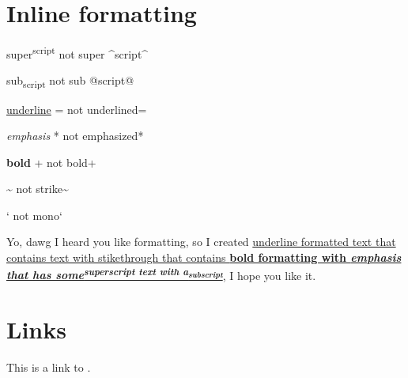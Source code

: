 \section{\label{inline-formatting}Inline formatting}
\par super\textsuperscript{script} not super {\textasciicircum}script{\textasciicircum}
\par sub\textsubscript{script} not sub @script@
\par \ul{underline}  = not underlined=
\par \emph{emphasis} * not emphasized*
\par \textbf{bold} + not bold+
\par {} {\textasciitilde} not strike{\textasciitilde}
\par \texttt{} ` not mono`
\par Yo, dawg I heard you like formatting, so I created \ul{underline formatted text that contains text with stikethrough that contains \textbf{bold formatting with \emph{emphasis that has some\textsuperscript{superscript text with a\textsubscript{subscript}}}}}, I hope you like it.
\section{\label{links}Links}
\par This is a link to . 